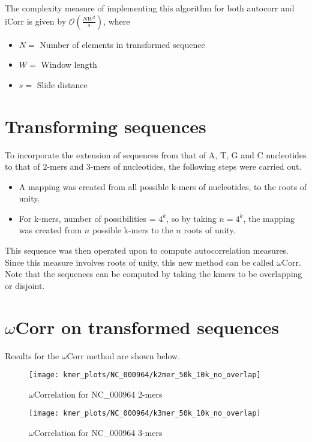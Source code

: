 \documentclass[10pt]{article}
\begin{document}
The complexity measure of implementing this algorithm for both autocorr and iCorr is given by $\mathcal{O}(\frac{NW^2}{s})$, where

\begin{itemize}
\item $N = $ Number of elements in transformed sequence
\item $W = $ Window length
\item $s = $ Slide distance
\end{itemize}

\section{Transforming sequences}

To incorporate the extension of sequences from that of A, T, G and C nucleotides to that of 2-mers and 3-mers of nucleotides, the following steps were carried out.

\begin{itemize}
\item A mapping was created from all possible k-mers of nucleotides, to the roots of unity.
\item For k-mers, number of possibilities = $4^k$, so by taking $n = 4^k$, the mapping was created from $n$ possible k-mers to the $n$ roots of unity.
\end{itemize}

This sequence was then operated upon to compute autocorrelation measures. Since this measure involves roots of unity, this new method can be called $\omega$Corr. Note that the sequences can be computed by taking the kmers to be overlapping or disjoint.

\section{$\omega$Corr on transformed sequences}

Results for the $\omega$Corr method are shown below.

\begin{figure}[H]
\centering
\texttt{[image: kmer\_plots/NC\_000964/k2mer\_50k\_10k\_no\_overlap]}
\captionsetup{justification=centering}
\caption{$\omega$Correlation for NC\_000964 2-mers}
\end{figure}

\begin{figure}[H]
\centering
\texttt{[image: kmer\_plots/NC\_000964/k3mer\_50k\_10k\_no\_overlap]}
\captionsetup{justification=centering}
\caption{$\omega$Correlation for NC\_000964 3-mers}
\end{figure}
\end{document}
